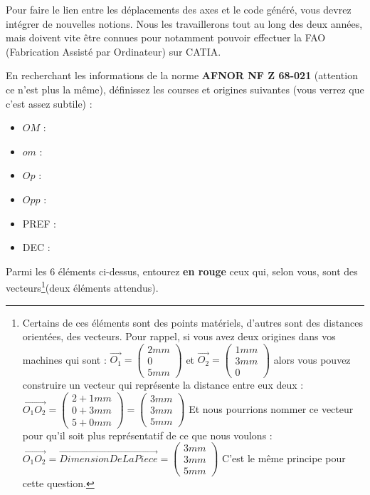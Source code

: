 \documentclass[12pt]{article}
\newcounter{exo}
\newenvironment{exo}{\stepcounter{exo}\vspace{0.5cm}{\bfseries Question \theexo\ :}}{\par\vspace{0.5cm}}
\begin{document}
Pour faire le lien entre les déplacements des axes et le code généré, vous devrez intégrer de nouvelles notions. Nous les travaillerons tout au long des deux années, mais doivent vite être connues pour notamment pouvoir effectuer la FAO (Fabrication Assisté par Ordinateur) sur CATIA.

\begin{exo}\label{exo1} En recherchant les informations de la norme \textbf{AFNOR NF Z 68-021} (attention ce n'est plus la même), définissez les courses et origines suivantes (vous verrez que c'est assez subtile) :\end{exo}
\begin{itemize}
    \item $OM$ :
    \item $om$ :
    \item $Op$ :
    \item $Opp$ :
    \item PREF :
    \item DEC :
\end{itemize}

\begin{exo}\label{exo66} Parmi les 6 éléments ci-dessus, entourez \textbf{en rouge} ceux qui, selon vous, sont des vecteurs\footnote{Certains de ces éléments sont des points matériels, d'autres sont des distances orientées, des vecteurs. Pour rappel, si vous avez deux origines dans vos machines qui sont : $\vec{O_1} =\begin{pmatrix} 2mm\\0\\5mm \end{pmatrix}$ et $\vec{O_2} =\begin{pmatrix} 1mm\\3mm\\0 \end{pmatrix}$ alors vous pouvez construire un vecteur qui représente la distance entre eux deux : $\overrightarrow{O_1O_2} =\begin{pmatrix} 2 + 1mm\\0 + 3 mm\\5 + 0mm \end{pmatrix}=\begin{pmatrix} 3mm\\3 mm\\5mm \end{pmatrix}$ Et nous pourrions nommer ce vecteur pour qu'il soit plus représentatif de ce que nous voulons :\\ $\overrightarrow{O_1O_2}=\overrightarrow{Dimension De La Piece}=\begin{pmatrix} 3mm\\3 mm\\5mm \end{pmatrix}$ C'est le même principe pour cette question.}(deux éléments attendus).  \end{exo}
\end{document}
